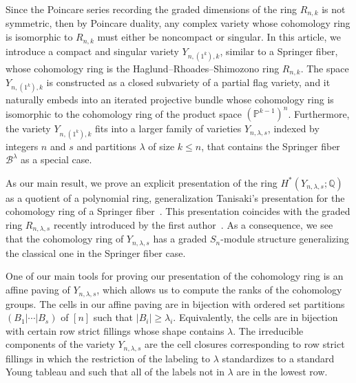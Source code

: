 \documentclass[submission]{FPSAC2021}
\theoremstyle{plain}
\numberwithin{equation}{section}
\newcommand{\JL}[1]{{\color{blue} JL: #1}}
\newcommand{\bP}{\mathbb{P}}
\newcommand{\bQ}{\mathbb{Q}}
\newcommand{\cB}{\mathcal{B}}
\newcommand{\la}{\lambda}
\begin{document}
Since the Poincare series recording the graded dimensions of the ring $R_{n,k}$ is not symmetric, then by Poincare duality, any complex variety whose cohomology ring is isomorphic to $R_{n,k}$ must either be noncompact or singular. In this article, we introduce a compact and singular variety $Y_{n,(1^k),k}$, similar to a Springer fiber, whose cohomology ring is the Haglund--Rhoades--Shimozono ring $R_{n,k}$. 
The space $Y_{n,(1^k),k}$ is constructed as a closed subvariety of a partial flag variety, and it naturally embeds into an iterated projective bundle whose cohomology ring is isomorphic to the cohomology ring of the product space $(\bP^{k-1})^n$.
 Furthermore, the variety $Y_{n,(1^k),k}$ fits into a larger family of varieties $Y_{n,\lambda,s}$, indexed by integers $n$ and $s$ and partitions $\lambda$ of size $k\leq n$, that contains the Springer fiber $\cB^\lambda$ as a special case. 






As our main result, we prove an explicit presentation of the ring $H^*(Y_{n,\la,s};\bQ)$ as a quotient of a polynomial ring, generalization Tanisaki's presentation for the cohomology ring of a Springer fiber~\cite{Tanisaki}. This presentation coincides with the graded ring $R_{n,\lambda,s}$ recently introduced by the first author~\cite{GriffinOSP}. 
As a consequence, we see that the cohomology ring of $Y_{n,\lambda,s}$ has a graded $S_n$-module structure generalizing the classical one in the Springer fiber case.

One of our main tools for proving our presentation of the cohomology ring is an affine paving  of $Y_{n,\lambda,s}$, which allows us to compute the ranks of the cohomology groups. The cells in our affine paving are in bijection with ordered set partitions $(B_1|\cdots|B_s)$ of $[n]$ such that $|B_i|\geq \lambda_i$. Equivalently, the cells are in bijection with certain row strict fillings whose shape contains $\lambda$. The irreducible components of the variety $Y_{n,\lambda,s}$ are the cell closures corresponding to row strict fillings in which the restriction of the labeling to $\lambda$ standardizes to a standard Young tableau and such that all of the labels not in $\lambda$ are in the lowest row.
\end{document}
